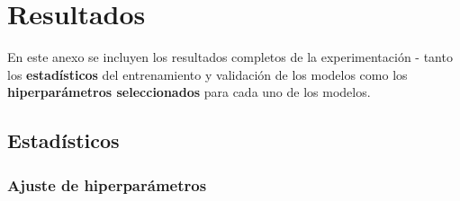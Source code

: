 \chapter{Resultados}

En este anexo se incluyen los resultados completos de la experimentación - tanto los \textbf{estadísticos} del entrenamiento y validación de los modelos como los \textbf{hiperparámetros seleccionados} para cada uno de los modelos.

\section{Estadísticos}

\subsection{Ajuste de hiperparámetros}

